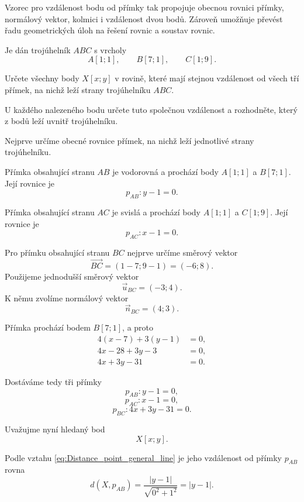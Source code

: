 Vzorec pro vzdálenost bodu od přímky tak propojuje obecnou rovnici
přímky, normálový vektor, kolmici i vzdálenost dvou bodů. Zároveň
umožňuje převést řadu geometrických úloh na řešení rovnic a soustav
rovnic.

\begin{example}\label{exa:Points_equidistant_from_triangle_side_lines}
    Je dán trojúhelník $ABC$ s vrcholy
    \[
        A[1;1],
        \qquad
        B[7;1],
        \qquad
        C[1;9].
    \]

    Určete všechny body $X[x;y]$ v rovině, které mají stejnou
    vzdálenost od všech tří přímek, na nichž leží strany
    trojúhelníku $ABC$.

    U každého nalezeného bodu určete tuto společnou vzdálenost
    a rozhodněte, který z bodů leží uvnitř trojúhelníku.

    Nejprve určíme obecné rovnice přímek, na nichž leží jednotlivé
    strany trojúhelníku.

    Přímka obsahující stranu $AB$ je vodorovná a prochází body
    $A[1;1]$ a $B[7;1]$. Její rovnice je
    \[
        p_{AB}:y-1=0.
    \]

    Přímka obsahující stranu $AC$ je svislá a prochází body
    $A[1;1]$ a $C[1;9]$. Její rovnice je
    \[
        p_{AC}:x-1=0.
    \]

    Pro přímku obsahující stranu $BC$ nejprve určíme směrový vektor
    \[
        \overrightarrow{BC}
        =
        (1-7;9-1)
        =
        (-6;8).
    \]
    Použijeme jednodušší směrový vektor
    \[
        \vec{u}_{BC}=(-3;4).
    \]
    K němu zvolíme normálový vektor
    \[
        \vec{n}_{BC}=(4;3).
    \]

    Přímka prochází bodem $B[7;1]$, a proto
    \begin{align*}
        4(x-7)+3(y-1)&=0,\\
        4x-28+3y-3&=0,\\
        4x+3y-31&=0.
    \end{align*}

    Dostáváme tedy tři přímky
    \[
        p_{AB}:y-1=0,
    \]
    \[
        p_{AC}:x-1=0,
    \]
    \[
        p_{BC}:4x+3y-31=0.
    \]

    Uvažujme nyní hledaný bod
    \[
        X[x;y].
    \]

    Podle vztahu \eqref{eq:Distance_point_general_line} je jeho
    vzdálenost od přímky $p_{AB}$ rovna
    \[
        d(X,p_{AB})
        =
        \frac{|y-1|}{\sqrt{0^2+1^2}}
        =
        |y-1|.
    \]


\end{example}

